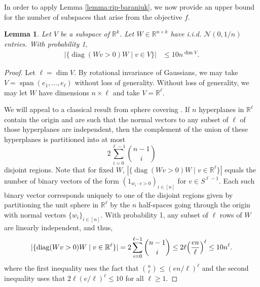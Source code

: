 \documentclass[11pt]{article}
\newtheorem{lemma}[theorem]{Lemma}
\newcommand{\R}{\mathbb{R}}
\newcommand{\spherel}{S^{\ell-1}}
\newcommand{\calN}{\mathcal{N}}
\newcommand{\wi}{w_i}
\newcommand{\ai}{a_i}
\DeclareMathOperator{\Span}{span}
\DeclareMathOperator{\diag}{diag}
\begin{document}
In order to apply Lemma \ref{lemma:rip-baraniuk}, we now provide an upper bound for the number of subspaces that arise from the objective $f$.

\begin{lemma} \label{lemma:combinatorial-bound-Apluszero} 
Let $V$ be a subspace of $\R^k$.  Let $W \in \R^{n \times k}$ have i.i.d. $\calN(0, 1/n)$ entries.    With probability 1, 
\begin{align}
| \{ \diag(Wv > 0) W \mid v \in V\} | &\leq 10 n^{\dim V}.
\end{align}
\end{lemma}
\begin{proof}
Let $\ell = \dim V$.  By rotational invariance of Gaussians, we may take $V= \Span(e_1, \ldots, e_\ell)$ without loss of generality.  Without loss of generality, we may let $W$  have dimensions $n \times \ell$ and take $V = \R^\ell$. 

We will appeal to a classical result from sphere covering \cite{wendel1962problem}.  If $n$ hyperplanes in $\R^\ell$ contain the origin and are such that the normal vectors to any subset of $\ell$ of those hyperplanes are independent, then the complement of the union of these hyperplanes is partitioned into at most 
\[
2 \sum_{i = 0}^{\ell-1}{n-1 \choose i}
\]
disjoint regions. Note that for fixed $W$,  $|\{ \diag(Wv>0) W \mid v \in \R^\ell\}|$ equals the number of binary vectors of the form $(1_{\wi \cdot v > 0})_{i \in [n]}$ for $ v \in \spherel$.  Each such binary vector corresponds uniquely to one of the disjoint regions given by partitioning the unit sphere in $\R^\ell$ by the $n$ half-spaces going through the origin with normal vectors $\{\wi\}_{i \in [n]}$.
With probability 1, any subset of $\ell$ rows of $W$ are linearly independent, and thus,
\[
|\{ \diag(Wv>0) W \mid v \in \R^\ell\}| = 2 \sum_{i = 0}^{\ell-1}{n-1 \choose i} \leq 2 \ell \Bigl(\frac{en}{\ell}\Bigr)^\ell \leq 10 n^\ell.
\]
where the first inequality uses the fact that ${n \choose \ell} \leq (en/\ell)^\ell$ and the second inequality uses that $2 \ell (e/\ell)^\ell \leq 10$ for all $\ell \geq 1$. 

%
%
\end{proof}
\end{document}
